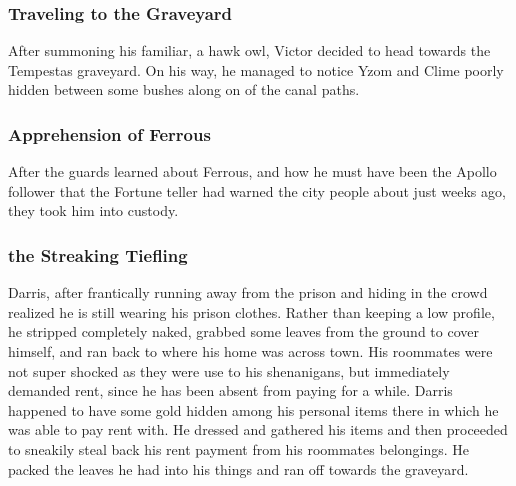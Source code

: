 \subsubsection{Traveling to the Graveyard}

After summoning his familiar, a hawk owl, Victor decided to head towards the Tempestas graveyard. On his way, he managed to notice Yzom and Clime poorly hidden between some bushes along on of the canal paths. 

\subsubsection{Apprehension of Ferrous}

After the guards learned about Ferrous, and how he must have been the Apollo follower that the Fortune teller had warned the city people about just weeks ago, they took him into custody. 

\subsubsection{the Streaking Tiefling}

Darris, after frantically running away from the prison and hiding in the crowd realized he is still wearing his prison clothes. Rather than keeping a low profile, he stripped completely naked, grabbed some leaves from the ground to cover himself, and ran back to where his home was across town. His roommates were not super shocked as they were use to his shenanigans, but immediately demanded rent, since he has been absent from paying for a while. Darris happened to have some gold hidden among his personal items there in which he was able to pay rent with. He dressed and gathered his items and then proceeded to sneakily steal back his rent payment from his roommates belongings. He packed the leaves he had into his things and ran off towards the graveyard.